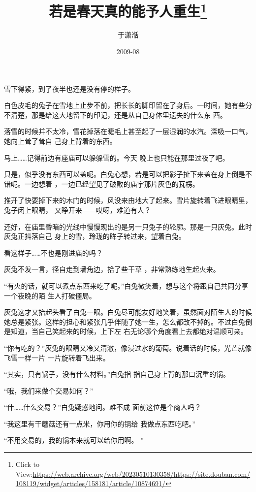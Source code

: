 \documentclass{article}
\title{若是春天真的能予人重生\footnote{Click to View:\url{https://web.archive.org/web/20230510130358/https://site.douban.com/108119/widget/articles/158181/article/10874691/}}}
\author{于潇湉}
\date{2009-08}
\begin{document}

\maketitle


\Large

﻿雪下得紧，到了夜半也还是没有停的样子。
 

白色皮毛的兔子在雪地上止步不前，把长长的脚印留在了身后。一时间，她有些分不清楚，那是给这大地留下的印记，还是从自己身体里遗失的什么东
西。 

落雪的时候并不太冷，雪花掉落在睫毛上甚至起了一层湿润的水汽。深吸一口气，她向上耸了耸自
己身上背着的东西。 

马上……记得前边有座庙可以躲躲雪的。今天
晚上也只能在那里过夜了吧。 

\newpage

只是，似乎没有东西可以盖呢。白兔心想，若是可以把影子扯下来盖在身上倒是不错呢。一边想着
，一边已经望见了破败的庙宇那片灰色的瓦楞。 

推开了快要掉下来的木门的时候，风没来由地大了起来。雪片旋转着飞进眼睛里，兔子闭上眼睛，
又睁开来——哎呀，难道有人？ 

还好，在庙里昏暗的光线中慢慢现出的是另一只兔子的轮廓。那是一只灰兔。此时灰兔正抖落自己
身上的雪，玲珑的眸子转过来，望着白兔。 


看这样子……不也是刚进庙的吗？ 

灰兔不发一言，径自走到墙角边，拾了些干草
，非常熟练地生起火来。 

“有火的话，就可以煮点东西来吃了呢。”白兔微笑着，想与这个将跟自己共同分享一个夜晚的陌
生人打破僵局。 

\newpage

灰兔这才又抬起头看了白兔一眼。白兔尽可能友好地笑着，虽然面对陌生人的时候她总是紧张。这样的担心和紧张几乎伴随了她一生，怎么都改不掉的。不过白兔倒是知道，当自己笑起来的时候，上下左
右无论哪个角度看上去都绝对温顺可亲。 

“你有吃的？”灰兔的眼睛又冷又清澈，像浸过水的葡萄。说着话的时候，光芒就像飞雪一样一片
一片旋转着飞出来。 

“其实，只有锅子，没有什么材料。”白兔指
指自己身上背的那口沉重的锅。 


“哦，我们来做个交易如何？” 

“什……什么交易？”白兔疑惑地问。难不成
面前这位是个商人吗？ 

“我这里有干蘑菇还有一点米，你用你的锅给
我做点东西吃吧。” 

\newpage

“不用交易的，我的锅本来就可以给你用啊。
” 
\end{document}
